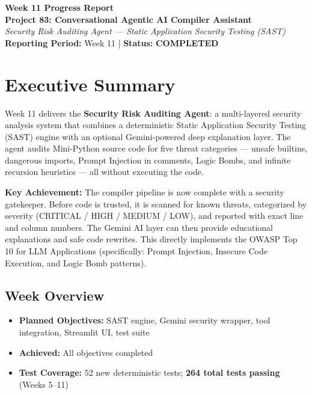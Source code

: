 \documentclass[a4paper,11pt]{article}
\newcommand{\statusgood}[1]{\colorbox{green!20}{\textbf{#1}}}
\begin{document}
\begin{center}
    {\huge \textbf{Week 11 Progress Report}} \\
    \vspace{3mm}
    {\large \textbf{Project 83: Conversational Agentic AI Compiler Assistant}} \\
    \vspace{2mm}
    \textit{Security Risk Auditing Agent --- Static Application Security Testing (SAST)} \\
    \vspace{2mm}
    \textbf{Reporting Period:} Week 11 | \textbf{Status:} \statusgood{COMPLETED}
\end{center}

\vspace{5mm}

\section{Executive Summary}

Week 11 delivers the \textbf{Security Risk Auditing Agent}: a multi-layered security analysis system that combines a deterministic Static Application Security Testing (SAST) engine with an optional Gemini-powered deep explanation layer. The agent audits Mini-Python source code for five threat categories — unsafe builtins, dangerous imports, Prompt Injection in comments, Logic Bombs, and infinite recursion heuristics — all without executing the code.

\textbf{Key Achievement:} The compiler pipeline is now complete with a security gatekeeper. Before code is trusted, it is scanned for known threats, categorized by severity (CRITICAL / HIGH / MEDIUM / LOW), and reported with exact line and column numbers. The Gemini AI layer can then provide educational explanations and safe code rewrites. This directly implements the OWASP Top 10 for LLM Applications (specifically: Prompt Injection, Insecure Code Execution, and Logic Bomb patterns).

\subsection{Week Overview}
\begin{itemize}[leftmargin=*]
    \item \textbf{Planned Objectives:} SAST engine, Gemini security wrapper, tool integration, Streamlit UI, test suite
    \item \textbf{Achieved:} All objectives completed
    \item \textbf{Test Coverage:} 52 new deterministic tests; \textbf{264 total tests passing} (Weeks 5--11)
\end{itemize}
\end{document}
